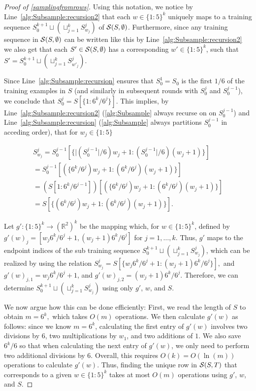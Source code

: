 \begin{proof}[Proof of \cref{samplingfromrows}]
  
 Using this notation, we notice by Line~\ref{alg:Subsample:recursion2} that each $w\in \{1:5\}^{k}$ uniquely maps to a training sequence $S_{0}^{k+1}\sqcup(\sqcup_{j=1}^{k} S_{w_{j}}^{j} )$ of $\mathcal{S}(S,\emptyset)$. Furthermore, since any training sequence in $ \mathcal{S}(S,\emptyset) $ can be written like this by Line~\ref{alg:Subsample:recursion2} we also get that each $ S'\in \mathcal{S}(S,\emptyset) $ has a corresponding $ w'\in \{ 1:5 \}^{k} $, such that $ S'= S_{0}^{k+1}\sqcup(\sqcup_{j=1}^{k} S_{w'_{j}}^{j} )$.   
  
Since Line~\ref{alg:Subsample:recursion} ensures that $S_0^{1}=S_0$ is the first $1/6$ of the training examples in $S$ (and similarly in subsequent rounds with $ S_{0}^{j} $ and $ S_{0}^{j-1} $), we conclude that $S_0^{j}=S[\{1:6^{k}/6^{j}\}]$. This implies, by Line~\ref{alg:Subsample:recursion2} (\cref{alg:Subsample} always  recurse on on $S_0^{j-1}$) and  Line~\ref{alg:Subsample:recursion} (\cref{alg:Subsample} always partitions $S_{0}^{j-1}$ in acceding order), that for $w_j\in\{1:5\}$ 
  
  

  \begin{align*}
    S_{w_{j}}^{j}=S_0^{j-1}[\{|(S_0^{j-1}|/6)w_{j}+1:(S_0^{j-1}|/6)(w_{j}+1)\}]\\
    =S_0^{j-1}[(\{6^{k}/6^{j})w_{j}+1:(6^{k}/6^{j})(w_{j}+1)\}]\\
    =\left(S[1:6^{k}/6^{j-1}]\right)[(\{6^{k}/6^{j})w_{j}+1:(6^{k}/6^{j})(w_{j}+1)\}]\\
    =S[\{(6^{k}/6^{j})w_{j}+1:(6^{k}/6^{j})(w_{j}+1)\}].
  \end{align*}
  
  
  Let $g':\{1:5\}^{k}\rightarrow {(\mathbb{R}^{2})}^{k}$ be the mapping which, for $w\in\{1:5\}^{k}$, defined by $g'(w)_{j}=[  w_j6^{k}/6^{j}+1,(w_j+1) 6^{k}/6^{j}]$ for $j=1,\ldots,k$.
  Thus, $ g' $ maps to the endpoint indices of the sub training sequence $S_{0}^{k+1}\sqcup(\sqcup_{j=1}^{k} S_{w_{j}}^{j} )$, which can be realized by using the relation $  S_{w_{j}}^{j}
  =S[\{w_{j}6^{k}/6^{j}+1:(w_{j}+1)6^{k}/6^{j}\}],$ and $g'(w)_{j,1}=w_{j}6^{k}/6^{j}+1$, and $g'(w)_{j,2}=(w_{j}+1)6^{k}/6^{j}$. Therefore, we can determine $S_{0}^{k+1}\sqcup(\sqcup_{j=1}^{k} S_{w_{j}}^{j} )$ using only $g'$, $w$, and $S$. 

  We now argue how this can be done efficiently: First, we read the length of $ S $ to obtain $ m=6^{k}, $ which takes $ O(m) $ operations. We then calculate $g'(w)$ as follows:  since we know $ m =6^{k}$, calculating the first entry of $g'(w)$ involves two divisions by $6$, two multiplications by $w_1$, and two additions of $1$. We also save $6^{k}/6$ so that when calculating the next entry of $g'(w)$, we only need to perform two additional divisions by $6$. Overall, this requires $O(k)=O(\ln{\left(m \right)})$ operations to calculate $g'(w)$. 
  Thus, finding the unique row in $ \mathcal{S}(S,T) $ that corresponds to a given  $w\in \{ 1:5 \}^{k}$ takes at most $O(m)$ operations using $g'$, $w$, and $S$.


\end{proof}
